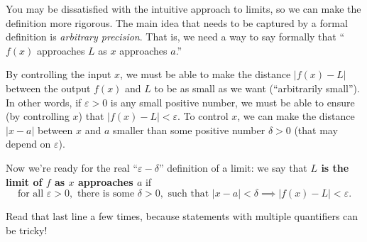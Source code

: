 You may be dissatisfied with the intuitive approach to limits, so we can make the definition more rigorous. The main idea that needs to be captured by a formal definition is \textit{arbitrary precision}. That is, we need a way to say formally that ``$f(x)$ approaches $L$ as $x$ approaches $a$.''

By controlling the input $x$, we must be able to make the distance $|f(x)-L|$ between the output $f(x)$ and $L$ to be as small as we want (``arbitrarily small''). In other words, if $\varepsilon>0$ is any small positive number, we must be able to ensure (by controlling $x$) that $|f(x)-L| < \varepsilon$. To control $x$, we can make the distance $|x-a|$ between $x$ and $a$ smaller than some positive number $\delta > 0$ (that may depend on $\varepsilon$).

Now we're ready for the real ``$\varepsilon-\delta$'' definition of a limit: we say that \textbf{$L$ is the limit of $f$ as $x$ approaches $a$} if
$$\text{for all } \varepsilon > 0, \text{ there is some } \delta > 0, \text{ such that } |x - a| < \delta \implies |f(x) - L| <\varepsilon.$$

Read that last line a few times, because statements with multiple quantifiers can be tricky!

